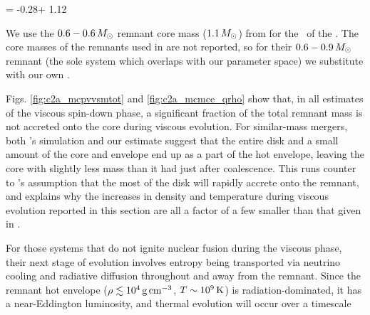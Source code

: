 \eqbegin
\frac{\Mcpv}{\Mce} = -0.28\qrho + 1.12
\label{eq:c2a_mfit}
\eqend

\noindent We use the $0.6 - 0.6\,\Msun$ remnant core mass ($1.1\,\Msun$) from \citealt{loreig09} for the \Mce\ of the \cite{ji+13}.  The core masses of the remnants used in \cite{schw+12} are not reported, so for their $0.6 - 0.9\,\Msun$ remnant (the sole system which overlaps with our parameter space) we substitute with our own \Mce.  

Figs. \ref{fig:c2a_mcpvvsmtot} and \ref{fig:c2a_mcmce_qrho} show that, in all estimates of the viscous spin-down phase, a significant fraction of the total remnant mass is not accreted onto the core during viscous evolution.  For similar-mass mergers, both \cite{ji+13}'s simulation and our estimate suggest that the entire disk and a small amount of the core and envelope end up as a part of the hot envelope, leaving the core with slightly less mass than it had just after coalescence.  This runs counter to \citeal{vkercj10}'s assumption that the most of the disk will rapidly accrete onto the remnant, and explains why the increases in density and temperature during viscous evolution reported in this section are all a factor of a few smaller than that given in \citeal{vkercj10}.




For those systems that do not ignite nuclear fusion during the viscous phase, their next stage of evolution involves entropy being transported via neutrino cooling and radiative diffusion throughout and away from the remnant.  Since the remnant hot envelope ($\rho \lesssim 10^4\,\gcc$, $T \sim 10^9\,\mathrm{K}$) is radiation-dominated, it has a near-Eddington luminosity, and thermal evolution will occur over a timescale \citep{shen+12}

